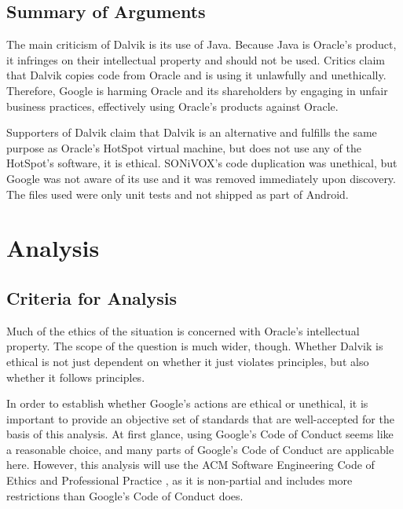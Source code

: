 \documentclass[11pt]{article}
\begin{document}
\begin{multicols}{2}

\subsection{Summary of Arguments} %
\label{sub:args-summary}

The main criticism of Dalvik is its use of Java.  Because Java is Oracle's
product, it infringes on their intellectual property and should not be used.
Critics claim that Dalvik copies code from Oracle and is using it unlawfully and
unethically.  Therefore, Google is harming Oracle and its shareholders by
engaging in unfair business practices, effectively using Oracle's products
against Oracle.

Supporters of Dalvik claim that Dalvik is an alternative and fulfills the same
purpose as Oracle's HotSpot virtual machine, but does not use any of the
HotSpot's software, it is ethical.  SONiVOX's code duplication was unethical,
but Google was not aware of its use and it was removed immediately upon
discovery.  The files used were only unit tests and not shipped as part of
Android.



\section{Analysis} %
\label{sec:analysis}

\subsection{Criteria for Analysis} %
\label{sub:criteria}

Much of the ethics of the situation is concerned with Oracle's intellectual
property.  The scope of the question is much wider, though.  Whether Dalvik is
ethical is not just dependent on whether it just violates principles, but also
whether it follows principles.

In order to establish whether Google's actions are ethical or unethical, it is
important to provide an objective set of standards that are well-accepted for
the basis of this analysis.  At first glance, using Google's Code of Conduct
\cite{google-conduct} seems like a reasonable choice, and many parts of Google's
Code of Conduct are applicable here.  However, this analysis will use the ACM
Software Engineering Code of Ethics and Professional Practice \cite{secode}, as
it is non-partial and includes more restrictions than Google's Code of Conduct
does.


\end{multicols}
\end{document}
